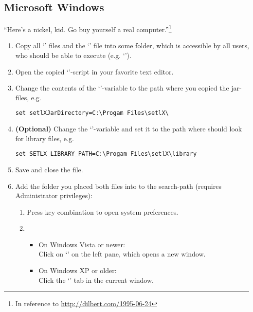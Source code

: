 \subsection{Microsoft Windows}

\begin{center}
\large
``Here's a nickel, kid. Go buy yourself a real computer.''\footnote{In reference to \url{http://dilbert.com/1995-06-24}}
\end{center}

\begin{enumerate}
	\item Copy all `' files and the `' file into some folder, which is accessible by all users, who should be able to execute \setlX{} (e.g. `').
	\item Open the copied `'-script in your favorite text editor.
	\item Change the contents of the `'-variable to the path where you copied the jar-files, e.g.
\begin{lstlisting}[frame=none,numbers=none]
set setlXJarDirectory=C:\Progam Files\setlX\
\end{lstlisting}
	\item \textbf{(Optional)} Change the `'-variable and set it to the path where \setlX{} should look for library files, e.g.
\begin{lstlisting}[frame=none,numbers=none]
set SETLX_LIBRARY_PATH=C:\Progam Files\setlX\library
\end{lstlisting}
	\item Save and close the file.
	\item Add the folder you placed both files into to the search-path (requires Administrator privileges):
	\begin{enumerate}
		\item Press \command{[Win]+[Pause]} key combination to open system preferences.
		\item 
		\begin{itemize}
			\item On Windows Vista or newer:\\Click on `' on the left pane, which opens a new window.
			\item On Windows XP or older:\\Click the `\command{Advanced}' tab in the current window.

\end{itemize}
\end{enumerate}
\end{enumerate}
